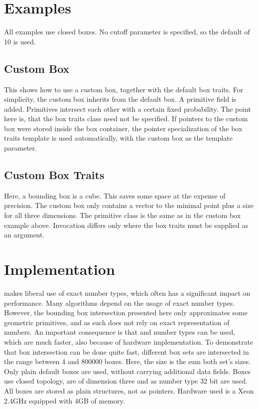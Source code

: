 \section*{Examples}
All examples use closed boxes. No cutoff parameter is specified, so the default of 10 is used. 

\subsection*{Custom Box}
This shows how to use a custom box, together with the default box traits. For simplicity, the custom box inherits from the default box. A primitive field is added. Primitives intersect each other with a certain fixed probability. The point here is, that the box traits class need not be specified. If pointers to the custom box were stored inside the box container, the pointer specialization of the box traits template is used automatically, with the custom box as the template parameter.


\subsection*{Custom Box Traits }
Here, a bounding box is a cube. This saves some space at the expense of precision. The custom box only contains a vector to the minimal point plus a size for all three dimensions. The primitive class is the same as in the custom box example above. Invocation differs only where the box traits must be supplied as an argument.

\newpage
\section*{Implementation}
\cgal{} makes liberal use of exact number types, which often has a significant impact on performance. Many algorithms depend on the usage of exact number types. However, 
the bounding box intersection presented here only approximates some geometric primitives, and as such does not rely on exact representation of numbers. An important consequence is that  and  number types can be used, which are much faster, also because of hardware implementation. To demonstrate that box intersection can be done quite fast, different box sets are intersected in the range between 4 and 800000 boxes. Here, the size is the sum both set's sizes. Only plain default boxes are used, without carrying additional data fields. Boxes use closed topology, are of dimension three and as number type 32 bit  are used. All boxes are stored as plain structures, not as pointers. Hardware used is a Xeon 2.4GHz equipped with 4GB of memory.


